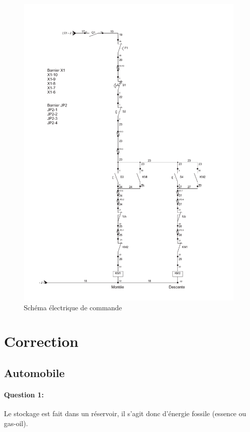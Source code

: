 \begin{figure}[!h]
\begin{center}
\includegraphics[width=0.9\linewidth]{img/schema2.pdf}
\caption{Schéma électrique de commande}
\label{fig:image15}
\end{center}
\end{figure}


\ifdef{\public}{}{}

\newpage

\pagestyle{correction}

\section{Correction}

\subsection{Automobile}

\paragraph{Question 1:} Le stockage est fait dans un réservoir, il s'agit donc d'énergie fossile (essence ou gas-oil).

